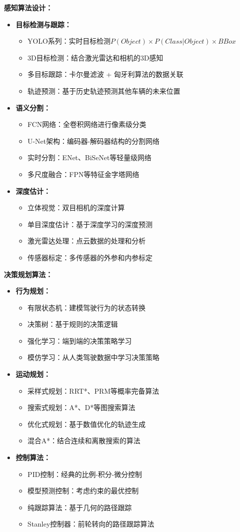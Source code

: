\textbf{感知算法设计：}
\begin{itemize}
\item \textbf{目标检测与跟踪：}
\begin{itemize}
\item YOLO系列：实时目标检测$P(Object) \times P(Class|Object) \times BBox$
\item 3D目标检测：结合激光雷达和相机的3D感知
\item 多目标跟踪：卡尔曼滤波 + 匈牙利算法的数据关联
\item 轨迹预测：基于历史轨迹预测其他车辆的未来位置
\end{itemize}
\item \textbf{语义分割：}
\begin{itemize}
\item FCN网络：全卷积网络进行像素级分类
\item U-Net架构：编码器-解码器结构的分割网络
\item 实时分割：ENet、BiSeNet等轻量级网络
\item 多尺度融合：FPN等特征金字塔网络
\end{itemize}
\item \textbf{深度估计：}
\begin{itemize}
\item 立体视觉：双目相机的深度计算
\item 单目深度估计：基于深度学习的深度预测
\item 激光雷达处理：点云数据的处理和分析
\item 传感器标定：多传感器的外参和内参标定
\end{itemize}
\end{itemize}

\textbf{决策规划算法：}
\begin{itemize}
\item \textbf{行为规划：}
\begin{itemize}
\item 有限状态机：建模驾驶行为的状态转换
\item 决策树：基于规则的决策逻辑
\item 强化学习：端到端的决策策略学习
\item 模仿学习：从人类驾驶数据中学习决策策略
\end{itemize}
\item \textbf{运动规划：}
\begin{itemize}
\item 采样式规划：RRT*、PRM等概率完备算法
\item 搜索式规划：A*、D*等图搜索算法
\item 优化式规划：基于数值优化的轨迹生成
\item 混合A*：结合连续和离散搜索的算法
\end{itemize}
\item \textbf{控制算法：}
\begin{itemize}
\item PID控制：经典的比例-积分-微分控制
\item 模型预测控制：考虑约束的最优控制
\item 纯跟踪算法：基于几何的路径跟踪
\item Stanley控制器：前轮转向的路径跟踪算法
\end{itemize}
\end{itemize}

